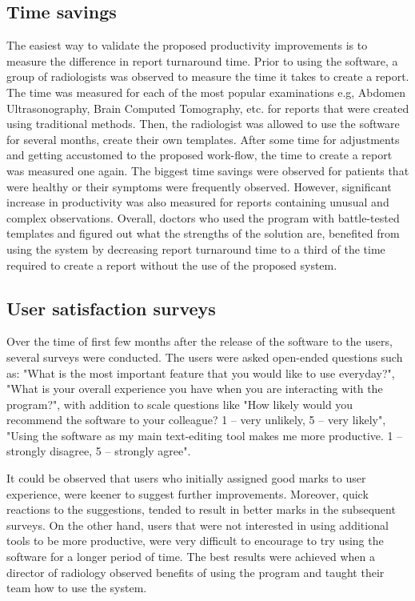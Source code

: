 \documentclass[12pt, twoside, openany]{report}
\theoremstyle{definition}
\begin{document}
\subsection{Time savings}
The easiest way to validate the proposed productivity improvements is to measure the difference in report turnaround time. Prior to using the software, a group of radiologists was observed to measure the time it takes to create a report. The time was measured for each of the most popular examinations e.g, Abdomen Ultrasonography, Brain Computed Tomography, etc. for reports that were created using traditional methods. Then, the radiologist was allowed to use the software for several months, create their own templates. After some time for adjustments and getting accustomed to the proposed work-flow, the time to create a report was measured one again. The biggest time savings were observed for patients that were healthy or their symptoms were frequently observed. However, significant increase in productivity was also measured for reports containing unusual and complex observations. Overall, doctors who used the program with battle-tested templates and figured out what the strengths of the solution are, benefited from using the system by decreasing report turnaround time to a third of the time required to create a report without the use of the proposed system. 

\subsection{User satisfaction surveys}
Over the time of first few months after the release of the software to the users, several surveys were conducted. The users were asked open-ended questions such as: "What is the most important feature that you would like to use everyday?", "What is your overall experience you have when you are interacting with the program?", with addition to scale questions like "How likely would you recommend the software to your colleague? 1 – very unlikely, 5 – very likely", "Using the software as my main text-editing tool makes me more productive. 1 – strongly disagree, 5 – strongly agree".

It could be observed that users who initially assigned good marks to user experience, were keener to suggest further improvements. Moreover, quick reactions to the suggestions, tended to result in better marks in the subsequent surveys. On the other hand, users that were not interested in using additional tools to be more productive, were very difficult to encourage to try using the software for a longer period of time. The best results were achieved when a director of radiology observed benefits of using the program and taught their team how to use the system.
\end{document}
